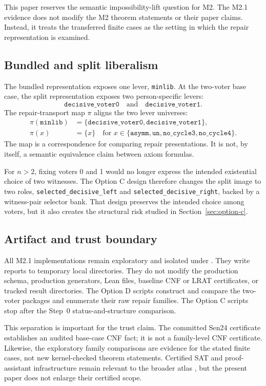 This paper reserves the semantic impossibility-lift question for M2.  The M2.1
evidence does not modify the M2 theorem statements or their paper claims.
Instead, it treats the transferred finite cases as the setting in which the
repair representation is examined.

\subsection{Bundled and split liberalism}

The bundled representation exposes one lever, \texttt{minlib}.  At the
two-voter base case, the split representation exposes two person-specific
levers:
\[
  \mathtt{decisive\_voter0}
  \quad\text{and}\quad
  \mathtt{decisive\_voter1}.
\]
The repair-transport map $\pi$ aligns the two lever universes:
\[
\begin{aligned}
  \pi(\mathtt{minlib})
    &= \{\mathtt{decisive\_voter0},
          \mathtt{decisive\_voter1}\},\\
  \pi(x) &= \{x\}
  \quad\text{for }x\in
  \{\mathtt{asymm},\mathtt{un},
    \mathtt{no\_cycle3},\mathtt{no\_cycle4}\}.
\end{aligned}
\]
The map is a correspondence for comparing repair presentations.  It is not, by
itself, a semantic equivalence claim between axiom formulas.

For $n>2$, fixing voters 0 and 1 would no longer express the intended
existential choice of two witnesses.  The Option C design therefore changes
the split image to two roles,
\texttt{selected\_decisive\_left} and
\texttt{selected\_decisive\_right}, backed by a witness-pair selector bank.
That design preserves the intended choice among voters, but it also creates the
structural risk studied in Section~\ref{sec:option-c}.

\subsection{Artifact and trust boundary}

All M2.1 implementations remain exploratory and isolated under
.  They write reports to temporary local
directories.  They do not modify the production schema, production generators,
Lean files, baseline CNF or LRAT certificates, or tracked result directories.
The Option D scripts construct and compare the two-voter packages and enumerate
their raw repair families.  The Option C scripts stop after the Step~0
status-and-structure comparison.

This separation is important for the trust claim.  The committed Sen24
certificate establishes an audited base-case CNF fact; it is not a
family-level CNF certificate.  Likewise, the exploratory family comparisons
are evidence for the stated finite cases, not new kernel-checked theorem
statements.  Certified SAT and proof-assistant infrastructure remain relevant
to the broader atlas \citep{moura2021lean4,cruzfilipe2017lrat}, but the present
paper does not enlarge their certified scope.
